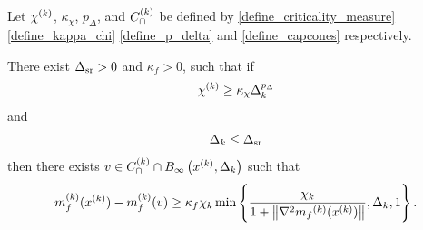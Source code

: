 \begin{theorem}
\label{sufficient_reduction_theorem}
Let 
${\chi^{(k)}}$,
$\kappa_{\chi}$,
$p_{\Delta}$,
and ${C^{(k)}_{\cap}}$
be defined by
\cref{define_criticality_measure}
\cref{define_kappa_chi}
\cref{define_p_delta}
and \cref{define_capcones}
respectively.



There exist ${\Delta_{\textrm{sr}}}>0$ and $\kappa_f > 0$, such that if
\begin{align}
{\chi^{(k)}} \ge \kappa_{\chi} \Delta_k^{p_{\Delta}} \label{sr_chi_big_enough}
\end{align}
and
\begin{align}
\Delta_k \le {\Delta_{\textrm{sr}}} \label{sr_delta_small_enough}
\end{align}
then there exists $v \in {C^{(k)}_{\cap}} \cap { B_{\infty}\left(x^{(k)}, \Delta_k\right) }$ such that
\begin{align*}
m_f^{(k)}(x^{(k)}) - m_f^{(k)}(v)
\ge \kappa_f \chi_k \min\left\{ \frac{\chi_k}{1+\left\|\nabla^2 {{m}_f}^{(k)}(x^{(k)})\right\|}, \Delta_k, 1 \right\}.
\end{align*}

\end{theorem}

